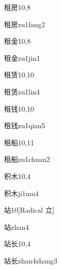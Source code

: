 \begin{entry}{租房}{10,8}
  \begin{phonetics}{租房}{zu1fang2}
  \end{phonetics}
\end{entry}

\begin{entry}{租金}{10,8}
  \begin{phonetics}{租金}{zu1jin1}
  \end{phonetics}
\end{entry}

\begin{entry}{租赁}{10,10}
  \begin{phonetics}{租赁}{zu1lin4}
  \end{phonetics}
\end{entry}

\begin{entry}{租钱}{10,10}
  \begin{phonetics}{租钱}{zu1qian5}
  \end{phonetics}
\end{entry}

\begin{entry}{租船}{10,11}
  \begin{phonetics}{租船}{zu1chuan2}
  \end{phonetics}
\end{entry}

\begin{entry}{积木}{10,4}
  \begin{phonetics}{积木}{ji1mu4}
  \end{phonetics}
\end{entry}

\begin{entry}{站}{10}[Radical 立]
  \begin{phonetics}{站}{zhan4}
  \end{phonetics}
\end{entry}

\begin{entry}{站长}{10,4}
  \begin{phonetics}{站长}{zhan4zhang3}
  \end{phonetics}
\end{entry}

